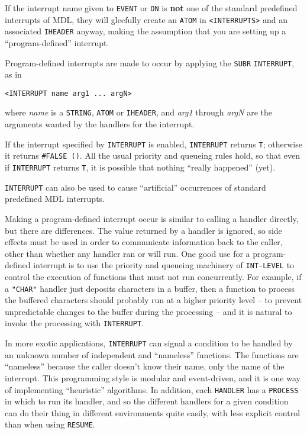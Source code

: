 \documentclass[a4paper,]{article}
\begin{document}
If the interrupt name given to \texttt{EVENT} or \texttt{ON} is \textbf{not} one of the standard predefined interrupts of
MDL, they will gleefully create an \texttt{ATOM} in \texttt{\textless{}INTERRUPTS\textgreater{}} and an associated
\texttt{IHEADER} anyway, making the assumption that you are setting up a ``program-defined'' interrupt.

Program-defined interrupts are made to occur by applying the \texttt{SUBR}
\texttt{INTERRUPT}, as in

\begin{verbatim}
<INTERRUPT name arg1 ... argN>
\end{verbatim}

where \emph{name} is a \texttt{STRING}, \texttt{ATOM} or \texttt{IHEADER}, and \emph{arg1} through \emph{argN} are the
arguments wanted by the handlers for the interrupt.

If the interrupt specified by \texttt{INTERRUPT} is enabled, \texttt{INTERRUPT} returns \texttt{T}; otherwise it returns
\texttt{\#FALSE\ ()}. All the usual priority and queueing rules hold, so that even if \texttt{INTERRUPT} returns
\texttt{T}, it is possible that nothing ``really happened'' (yet).

\texttt{INTERRUPT} can also be used to cause ``artificial'' occurrences of standard predefined MDL interrupts.

Making a program-defined interrupt occur is similar to calling a handler directly, but there are differences. The value
returned by a handler is ignored, so side effects must be used in order to communicate information back to the caller,
other than whether any handler ran or will run. One good use for a program-defined interrupt is to use the priority and
queueing machinery of \texttt{INT-LEVEL} to control the execution of functions that must not run concurrently. For example,
if a \texttt{"CHAR"} handler just deposits characters in a buffer, then a function to process the buffered characters
should probably run at a higher priority level -- to prevent unpredictable changes to the buffer during the processing --
and it is natural to invoke the processing with \texttt{INTERRUPT}.

In more exotic applications, \texttt{INTERRUPT} can signal a condition to be handled by an unknown number of independent
and ``nameless'' functions. The functions are ``nameless'' because the caller doesn't know their name, only the name of the
interrupt. This programming style is modular and event-driven, and it is one way of implementing ``heuristic'' algorithms.
In addition, each \texttt{HANDLER} has a \texttt{PROCESS} in which to run its handler, and so the
different handlers for a given condition can do their thing in different environments quite easily, with less explicit
control than when using \texttt{RESUME}.
\end{document}
